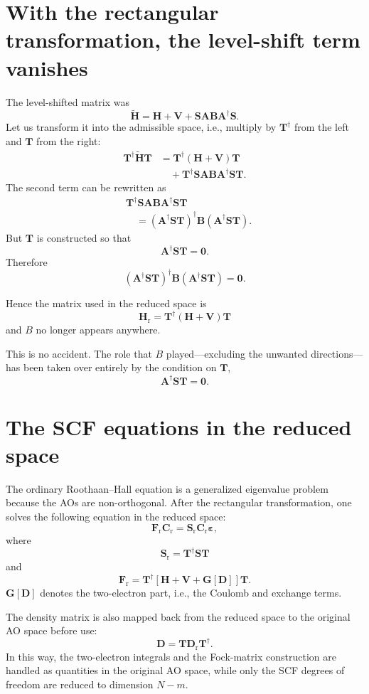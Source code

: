 \documentclass[11pt]{article}
\newcommand{\Hcore}{\mathbf H}
\newcommand{\Venv}{\mathbf V}
\newcommand{\Smat}{\mathbf S}
\newcommand{\Amat}{\mathbf A}
\newcommand{\Bmat}{\mathbf B}
\newcommand{\Tmat}{\mathbf T}
\newcommand{\Cr}{\mathbf C_{\mathrm r}}
\newcommand{\Fr}{\mathbf F_{\mathrm r}}
\newcommand{\Sr}{\mathbf S_{\mathrm r}}
\newcommand{\Dmat}{\mathbf D}
\newcommand{\Dr}{\mathbf D_{\mathrm r}}
\newcommand{\Gmat}{\mathbf G}
\begin{document}
\section{With the rectangular transformation, the level-shift term
vanishes}

The level-shifted matrix was
\[
  \widetilde{\Hcore}
  =
  \Hcore+\Venv+\Smat\Amat\Bmat\Amat^\dagger\Smat .
\]
Let us transform it into the admissible space, i.e., multiply by
\(\Tmat^\dagger\) from the left and \(\Tmat\) from the right:
\begin{align*}
\Tmat^\dagger\widetilde{\Hcore}\Tmat
&=
\Tmat^\dagger(\Hcore+\Venv)\Tmat \\
&\quad+
\Tmat^\dagger\Smat\Amat\Bmat\Amat^\dagger\Smat\Tmat .
\end{align*}
The second term can be rewritten as
\begin{align*}
&\Tmat^\dagger\Smat\Amat\Bmat\Amat^\dagger\Smat\Tmat \\
&\quad=
(\Amat^\dagger\Smat\Tmat)^\dagger
\Bmat
(\Amat^\dagger\Smat\Tmat).
\end{align*}
But \(\Tmat\) is constructed so that
\[
  \Amat^\dagger\Smat\Tmat=\mathbf 0 .
\]
Therefore
\[
  (\Amat^\dagger\Smat\Tmat)^\dagger
  \Bmat
  (\Amat^\dagger\Smat\Tmat)
  =
  \mathbf 0 .
\]

Hence the matrix used in the reduced space is
\[
  \boxed{
  \mathbf H_{\mathrm r}
  =
  \Tmat^\dagger(\Hcore+\Venv)\Tmat
  }
\]
and \(B\) no longer appears anywhere.

This is no accident. The role that \(B\) played---excluding the
unwanted directions---has been taken over entirely by the condition on
\(\Tmat\),
\[
  \Amat^\dagger\Smat\Tmat=\mathbf 0 .
\]

\section{The SCF equations in the reduced space}

The ordinary Roothaan--Hall equation is a generalized eigenvalue
problem because the AOs are non-orthogonal. After the rectangular
transformation, one solves the following equation in the reduced space:
\[
  \Fr\Cr=\Sr\Cr\boldsymbol\varepsilon ,
\]
where
\[
  \Sr=\Tmat^\dagger\Smat\Tmat
\]
and
\[
  \Fr
  =
  \Tmat^\dagger
  \left[
    \Hcore+\Venv+\Gmat[\Dmat]
  \right]
  \Tmat .
\]
\(\Gmat[\Dmat]\) denotes the two-electron part, i.e., the Coulomb and
exchange terms.

The density matrix is also mapped back from the reduced space to the
original AO space before use:
\[
  \Dmat = \Tmat\Dr\Tmat^\dagger .
\]
In this way, the two-electron integrals and the Fock-matrix
construction are handled as quantities in the original AO space, while
only the SCF degrees of freedom are reduced to dimension \(N-m\).
\end{document}

